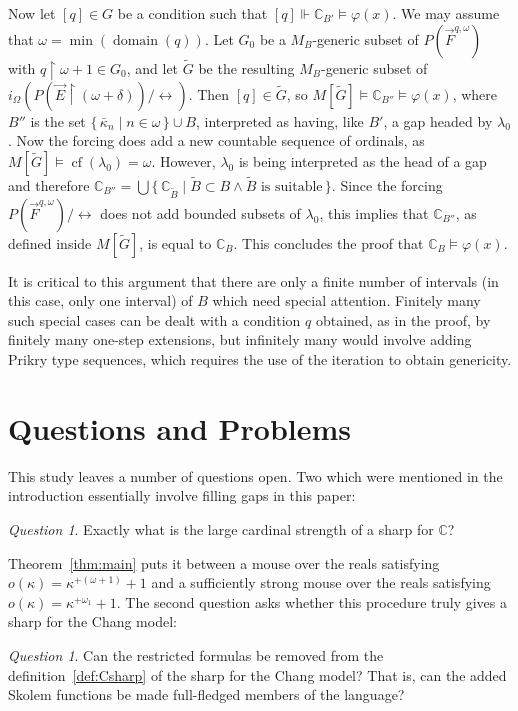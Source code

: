 \documentclass[
twoside,
]{article}
\theoremstyle{definition}
\theoremstyle{remark}
\newtheorem{question}[theorem]{Question}
\newcommand{\forceKappa}{\bar\kappa} %
\newcommand{\ords}{\Omega}
\newcommand\gkeq{\leftrightarrow}
\newcommand\mgkeq{/{\gkeq}}
\newcommand{\forces}{\Vdash}
\renewcommand{\phi}{\varphi}
\newcommand{\set}[1]{\{\,#1\,\}}
\newcommand{\restrict}{{\upharpoonright}}
\DeclareMathOperator{\domain}{domain}
\DeclareMathOperator{\cof}{cf}
\newcommand\chang{\mathbb{C}}
\begin{document}
Now let $[q]\in G$ be a condition such that $[q]\forces
\chang_{B'}\models\phi(x)$.  We may assume that
$\omega=\min(\domain(q))$.  Let $G_0$ be a $M_B$-generic subset of
$P(\vec F^{q,\omega})$ with $q\restrict\omega+1\in G_0$, and let
$\tilde G$ be the resulting 
$M_B$-generic subset of $i_\ords(P(\vec E\restrict(\omega+\delta))\mgkeq)$.
Then $[q]\in \tilde G$, so $M[\tilde G]\models
\chang_{B''}\models\phi(x)$, where $B''$ is the set
$\set{\forceKappa_n\mid n\in\omega}\cup B$, interpreted as having,
like $B'$, a gap headed by $\lambda_0$.  Now the forcing does add a
new countable sequence of ordinals, as  $M[\tilde
G]\models\cof(\lambda_0)=\omega$.  However, 
$\lambda_0$ is being interpreted as the head of a gap and therefore $\chang_{ B''}=\bigcup\set{\chang_{\tilde B}\mid \tilde B\subset B\land \tilde B\text { is suitable}}$.  
Since the forcing $P(\vec F^{q,\omega})\mgkeq$ does not add bounded subsets of $\lambda_0$, this implies that $\chang_{B''}$, as defined inside $M[\tilde G]$, is equal to 
$\chang_B$.   This concludes the proof that  $\chang_B\models\phi(x)$.

\bigskip{}
It is critical to this argument that there are only a finite number of intervals
(in this case, only one interval) of $B$ which need special attention.
Finitely many such special cases can be dealt with a condition $q$
obtained, as in the proof, by finitely many one-step extensions, but
infinitely many would involve
adding Prikry type sequences, which  requires the use of the 
iteration to obtain genericity.

\section{Questions and Problems}
\label{sec:questions}
This study leaves a number of questions open.  Two which were
mentioned in the introduction essentially involve filling gaps in this paper:

\begin{question}\label{q:exact}
  Exactly what is the large cardinal strength of a sharp for $\chang$?
\end{question}
Theorem~\ref{thm:main} puts it between a mouse over the reals satisfying
$o(\kappa)=\kappa^{+(\omega+1)}+1$ and a sufficiently strong mouse
over the reals
satisfying $o(\kappa)=\kappa^{+\omega_1}+1$.   The second question
asks whether this procedure truly gives a sharp for the Chang model:
\begin{question}
  Can the restricted formulas be removed from the
  definition~\ref{def:Csharp} of the sharp for the Chang model?  That
  is, can the added Skolem functions be made full-fledged members of
  the language?
\end{question}
\end{document}
